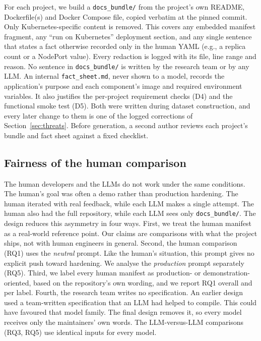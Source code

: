 For each project, we build a \texttt{docs\_bundle/} from the project's own README, Dockerfile(s) and Docker Compose file, copied verbatim at the pinned commit. Only Kubernetes-specific content is removed. This covers any embedded manifest fragment, any ``run on Kubernetes'' deployment section, and any single sentence that states a fact otherwise recorded only in the human YAML (e.g., a replica count or a NodePort value). Every redaction is logged with its file, line range and reason. No sentence in \texttt{docs\_bundle/} is written by the research team or by any LLM. An internal \texttt{fact\_sheet.md}, never shown to a model, records the application's purpose and each component's image and required environment variables. It also justifies the per-project requirement checks (D4) and the functional smoke test (D5). Both were written during dataset construction, and every later change to them is one of the logged corrections of Section~\ref{sec:threats}. Before generation, a second author reviews each project's bundle and fact sheet against a fixed checklist.

\subsection{Fairness of the human comparison}\label{sec:method-fairness}

The human developers and the LLMs do not work under the same conditions. The human's goal was often a demo rather than production hardening. The human iterated with real feedback, while each LLM makes a single attempt. The human also had the full repository, while each LLM sees only \texttt{docs\_bundle/}. The design reduces this asymmetry in four ways. First, we treat the human manifest as a real-world reference point. Our claims are comparisons with what the project ships, not with human engineers in general. Second, the human comparison (RQ1) uses the \emph{neutral} prompt. Like the human's situation, this prompt gives no explicit push toward hardening. We analyse the \emph{production} prompt separately (RQ5). Third, we label every human manifest as production- or demonstration-oriented, based on the repository's own wording, and we report RQ1 overall and per label. Fourth, the research team writes no specification. An earlier design used a team-written specification that an LLM had helped to compile. This could have favoured that model family. The final design removes it, so every model receives only the maintainers' own words. The LLM-versus-LLM comparisons (RQ3, RQ5) use identical inputs for every model.

